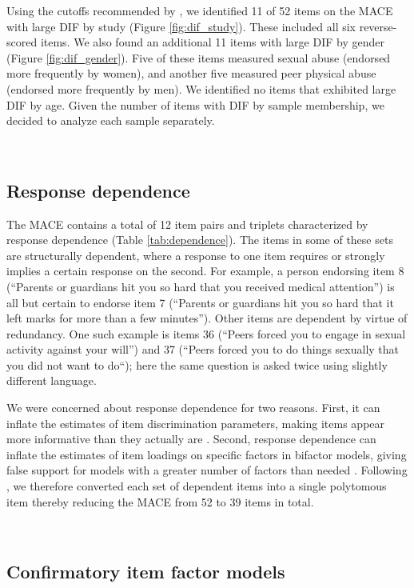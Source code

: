 \documentclass[letterpaper,man,natbib,noextraspace,floatsintext,longtable]{apa6}
\begin{document}
Using the cutoffs recommended by \cite{hidalgo2014binary}, we identified 11 of 52 items on the MACE with large DIF by study (Figure \ref{fig:dif_study}). These included all six reverse-scored items. We also found an additional 11 items with large DIF by gender (Figure \ref{fig:dif_gender}). Five of these items measured sexual abuse (endorsed more frequently by women), and another five measured peer physical abuse (endorsed more frequently by men). We identified no items that exhibited large DIF by age. Given the number of items with DIF by sample membership, we decided to analyze each sample separately.

{\begin{spacing}{0.2} \hfill \\ \end{spacing}} \subsection{Response dependence}

The MACE contains a total of 12 item pairs and triplets characterized by response dependence (Table \ref{tab:dependence}). The items in some of these sets are structurally dependent, where a response to one item requires or strongly implies a certain response on the second. For example, a person endorsing item 8 (``Parents or guardians hit you so hard that you received medical attention'') is all but certain to endorse item 7 (``Parents or guardians hit you so hard that it left marks for more than a few minutes''). Other items are dependent by virtue of redundancy. One such example is items 36 (``Peers forced you to engage in sexual activity against your will'') and 37 (``Peers forced you to do things sexually that you did not want to do``); here the same question is asked twice using slightly different language.

We were concerned about response dependence for two reasons. First, it can inflate the estimates of item discrimination parameters, making items appear more informative than they actually are \citep{marais2008formalizing}. Second, response dependence can inflate the estimates of item loadings on specific factors in bifactor models, giving false support for models with a greater number of factors than needed \citep{reise2013applying}. Following \cite{marais2008formalizing}, we therefore converted each set of dependent items into a single polytomous item thereby reducing the MACE from 52 to 39 items in total.

{\begin{spacing}{0.2} \hfill \\ \end{spacing}} \subsection{Confirmatory item factor models}
\end{document}

